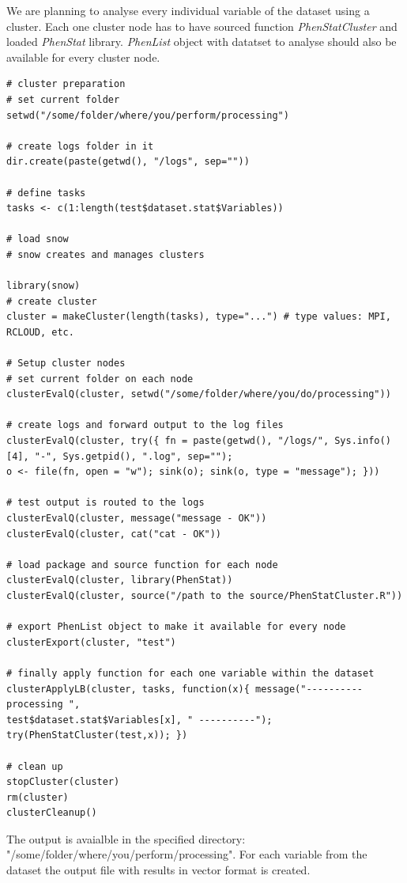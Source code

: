 \documentclass[12pt,a4paper]{article}
\begin{document}
We are planning to analyse every individual variable of the dataset using a cluster. Each one cluster node has to have sourced function \textit{PhenStatCluster} and loaded \textit{PhenStat} library. 
\textit{PhenList} object with datatset to analyse should also be available for every cluster node.
\begingroup
\fontsize{8pt}{12pt}\selectfont
\begin{verbatim}
# cluster preparation
# set current folder
setwd("/some/folder/where/you/perform/processing")

# create logs folder in it
dir.create(paste(getwd(), "/logs", sep=""))

# define tasks
tasks <- c(1:length(test$dataset.stat$Variables))

# load snow
# snow creates and manages clusters

library(snow)
# create cluster
cluster = makeCluster(length(tasks), type="...") # type values: MPI, RCLOUD, etc.

# Setup cluster nodes
# set current folder on each node
clusterEvalQ(cluster, setwd("/some/folder/where/you/do/processing"))

# create logs and forward output to the log files
clusterEvalQ(cluster, try({ fn = paste(getwd(), "/logs/", Sys.info()[4], "-", Sys.getpid(), ".log", sep=""); 
o <- file(fn, open = "w"); sink(o); sink(o, type = "message"); }))

# test output is routed to the logs
clusterEvalQ(cluster, message("message - OK"))
clusterEvalQ(cluster, cat("cat - OK"))

# load package and source function for each node
clusterEvalQ(cluster, library(PhenStat))
clusterEvalQ(cluster, source("/path to the source/PhenStatCluster.R"))

# export PhenList object to make it available for every node
clusterExport(cluster, "test") 

# finally apply function for each one variable within the dataset
clusterApplyLB(cluster, tasks, function(x){ message("---------- processing ", 
test$dataset.stat$Variables[x], " ----------"); try(PhenStatCluster(test,x)); })

# clean up
stopCluster(cluster)
rm(cluster)
clusterCleanup()
\end{verbatim}
\endgroup

The output is avaialble in the specified directory: 
"/some/folder/where/you/perform/processing". 
For each variable from the dataset the output file with results in vector format is created.
\end{document}
